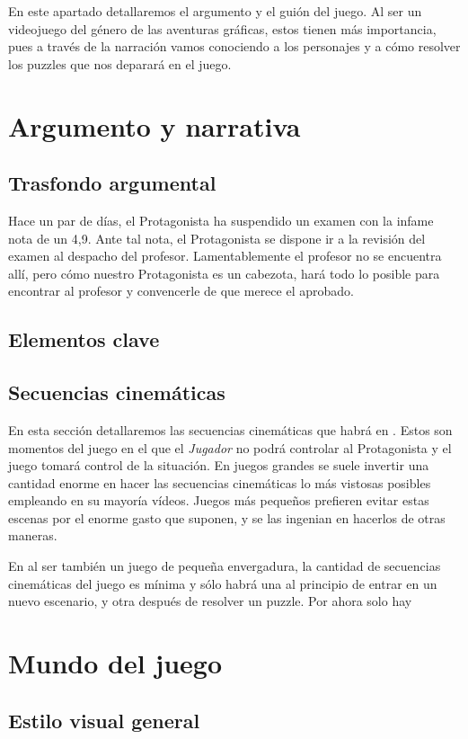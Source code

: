 En este apartado detallaremos el argumento y el guión del juego. Al ser \nombrejuego un videojuego del género de las aventuras gráficas, estos tienen más importancia, pues a través de la narración vamos conociendo a los personajes y a cómo resolver los puzzles que nos deparará en el juego. 
    \section{Argumento y narrativa}
        \subsection{Trasfondo argumental}
        Hace un par de días, el Protagonista ha suspendido un examen con la infame nota de un 4,9. Ante tal nota, el Protagonista se dispone ir a la revisión del examen al despacho del profesor. Lamentablemente el profesor no se encuentra allí, pero cómo nuestro Protagonista es un cabezota, hará todo lo posible para encontrar al profesor y convencerle de que merece el aprobado.
        
        \subsection{Elementos clave}
        \subsection{Secuencias cinemáticas}
        En esta sección detallaremos las secuencias cinemáticas que habrá en \nombrejuego. Estos son momentos del juego en el que el \emph{Jugador} no podrá controlar al Protagonista y el juego tomará control de la situación. En juegos grandes se suele invertir una cantidad enorme en hacer las secuencias cinemáticas lo más vistosas posibles empleando en su mayoría vídeos. Juegos más pequeños prefieren evitar estas escenas por el enorme gasto que suponen, y se las ingenian en hacerlos de otras maneras.
        
        En \nombrejuego al ser también un juego de pequeña envergadura, la cantidad de secuencias cinemáticas del juego es mínima y sólo habrá una al principio de entrar en un nuevo escenario, y otra después de resolver un puzzle. Por ahora solo hay 
            
    \section{Mundo del juego}
        \subsection{Estilo visual general}%
